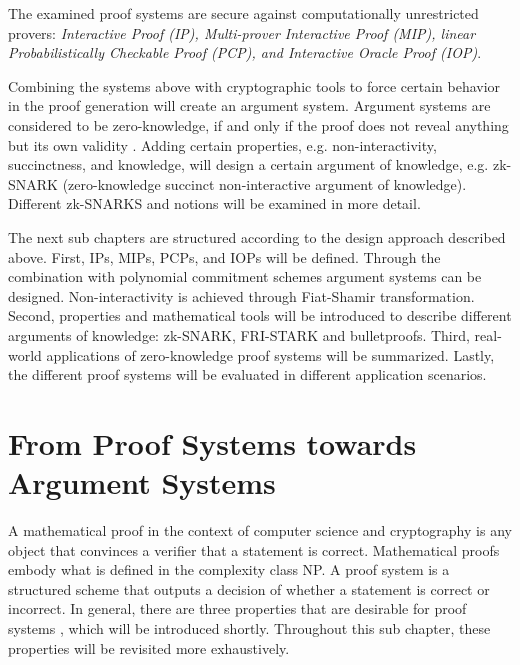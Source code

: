 The examined proof systems are secure against computationally unrestricted provers: \textit{Interactive Proof (IP), Multi-prover Interactive Proof (MIP), linear Probabilistically Checkable Proof (PCP), and Interactive Oracle Proof (IOP)}. 

Combining the systems above with cryptographic tools to force certain behavior in the proof generation will create an argument system. Argument systems are considered to be zero-knowledge, if and only if the proof does not reveal anything but its own validity \citep{GMR89}. Adding certain properties, e.g. non-interactivity, succinctness, and knowledge, will design a certain argument of knowledge, e.g. zk-SNARK (zero-knowledge succinct non-interactive argument of knowledge). Different zk-SNARKS and notions will be examined in more detail.

The next sub chapters are structured according to the design approach described above. First, IPs, MIPs, PCPs, and IOPs will be defined. Through the combination with polynomial commitment schemes argument systems can be designed. Non-interactivity is achieved through Fiat-Shamir transformation. Second, properties and mathematical tools will be introduced to describe different arguments of knowledge: zk-SNARK, FRI-STARK and bulletproofs. Third, real-world applications of zero-knowledge proof systems will be summarized. Lastly, the different proof systems will be evaluated in different application scenarios.

\begin{comment}
- what is zero knowledge definition
- what means indistinguishable
- different types of zero-knowledge (perfect, statistical, computational)
- ZKPs are part of verifiable computations
- what is verifiable computation
\end{comment}

\section{From Proof Systems towards Argument Systems}

A mathematical proof in the context of computer science and cryptography is any object that convinces a verifier that a statement is correct. Mathematical proofs embody what is defined in the complexity class NP. A proof system is a structured scheme that outputs a decision of whether a statement is correct or incorrect. In general, there are three properties that are desirable for proof systems \citep{GoldwasserIPs}, which will be introduced shortly. Throughout this sub chapter, these properties will be revisited more exhaustively.

